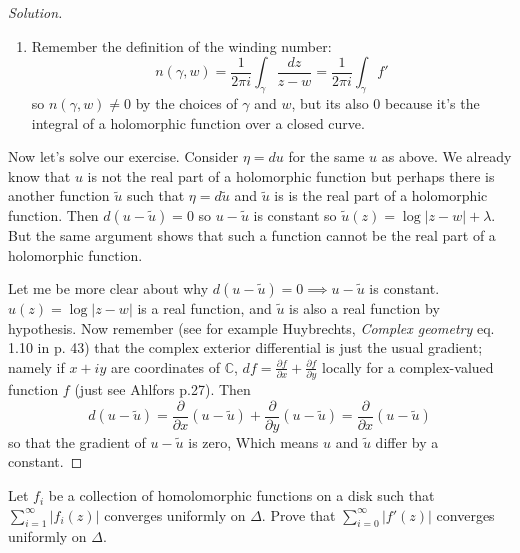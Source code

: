 \begin{proof}[Solution]
\begin{enumerate}[label=\textbf{Step \arabic*}]
	\item Remember the definition of the winding number:
	\[n(\gamma,w)=\frac{1}{2\pi i}\int_{\gamma}\frac{dz}{z-w}=\frac{1}{2\pi i}\int_{\gamma}f'\]
	so $n(\gamma,w)\neq0$ by the choices of $\gamma$ and $w$, but its also $0$ because it's the integral of a holomorphic function over a closed curve.
	\end{enumerate}



Now let's solve our exercise. Consider $\eta=du$ for the same $u$ as above. We already know that $u$ is not the real part of a holomorphic function but perhaps there is another function  $\tilde{u}$ such that $\eta= d\tilde{u}$ and $\tilde{u}$ is is the real part of a holomorphic function. Then $d(u-\tilde{u})=0$ {\color{6}so  $u-\tilde{u}$ is constant} so $\tilde{u}(z)=\log|z-w|+\lambda$. But the same argument shows that such a function cannot be the real part of a holomorphic function.

Let me be more clear about why $d(u-\tilde{u})=0\implies u-\tilde{u}$ is constant. $u(z)=\operatorname{log}|z-w|$ is a real function, and $\tilde{u}$ is also a real function by hypothesis. Now remember (see for example Huybrechts, \textit{Complex geometry} eq. 1.10 in p. 43) that the complex exterior differential is just the usual gradient; namely if $x+iy$ are coordinates of  $\mathbb{C}$, $df=\frac{\partial f}{\partial x}+\frac{\partial f}{\partial y}$ locally for a complex-valued function $f$ (just see Ahlfors p.27). Then
\[d(u-\tilde{u})= \frac{\partial }{\partial x}(u-\tilde{u})+ \frac{\partial }{\partial y}(u-\tilde{u})=\frac{\partial }{\partial x}(u-\tilde{u})\]
so that the gradient of $u-\tilde{u}$ is zero, Which means $u$ and  $\tilde{u}$ differ by a constant.
\end{proof}

\begin{manualexercise}{2.7}
	Let $f_{i}$ be a collection of homolomorphic functions on a disk such that $\sum_{i=1}^{\infty} |f_{i}(z)|$ converges uniformly on $\Delta$. Prove that $\sum_{i=0}^{\infty}|f'(z)|$ converges uniformly on $\Delta$.
\end{manualexercise}

